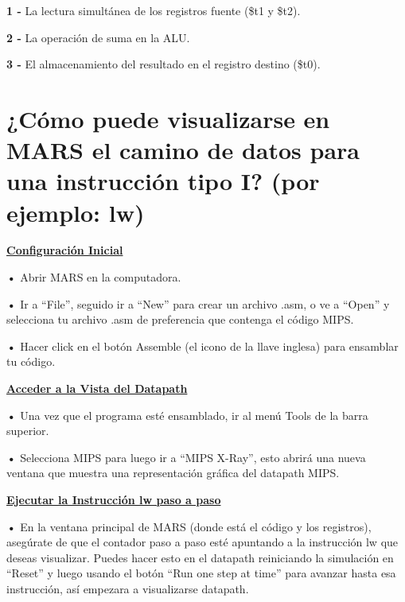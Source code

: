 \documentclass{article}
\begin{document}
\quad

\textbf{1 -  } { La lectura simultánea de los registros fuente (\$t1 y \$t2).}

\textbf{2 -  } { La operación de suma en la ALU.}

\textbf{3 -  } { El almacenamiento del resultado en el registro destino (\$t0).}

\quad
\newpage






\section{¿Cómo puede visualizarse en MARS el camino de datos para una instrucción tipo I? (por ejemplo: lw)}

\quad

\textbf{\underline{Configuración Inicial}}

\quad

\textbf{• } { Abrir MARS en la computadora.}

\quad

\textbf{• } { Ir a “File”, seguido ir a “New” para crear un archivo .asm, o ve a “Open” y selecciona tu archivo .asm de preferencia que contenga el código MIPS.}

\quad

\textbf{• } { Hacer click en el botón Assemble (el icono de la llave inglesa) para ensamblar tu código.}

\quad

\textbf{\underline{Acceder a la Vista del Datapath}}

\quad

\textbf{• } { Una vez que el programa esté ensamblado, ir al menú Tools de la barra superior.}

\quad

\textbf{• } { Selecciona MIPS para luego ir a “MIPS X-Ray”, esto abrirá una nueva ventana que muestra una representación gráfica del datapath MIPS.}

\quad

\textbf{\underline{Ejecutar la Instrucción lw paso a paso}}

\quad

\textbf{• } { En la ventana principal de MARS (donde está el código y los registros), asegúrate de que el contador paso a paso esté apuntando a la instrucción lw que deseas visualizar. Puedes hacer esto en el datapath reiniciando la simulación en “Reset” y luego usando el botón “Run one step at time” para avanzar hasta esa instrucción, así empezara a visualizarse datapath.}
\end{document}
